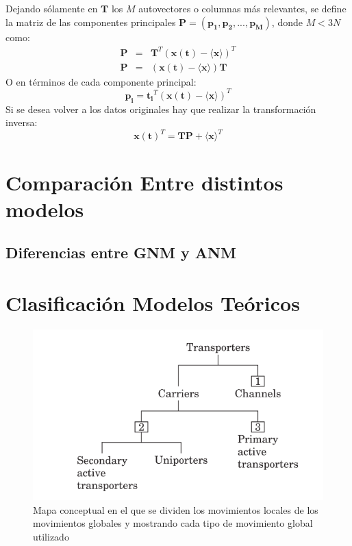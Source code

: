 Dejando s\'{o}lamente en $\mathbf{T}$ los $M$ autovectores o columnas m\'{a}s relevantes, se define la matriz de las componentes principales $\mathbf{P}=\left(\mathbf{p_1},\mathbf{p_2},...,\mathbf{p_{M}}\right)$, donde $M<3N$ como:
\begin{eqnarray}\label{eq:31}
\mathbf{P}&=&\mathbf{T}^T(\mathbf{x(t)}-\langle\mathbf{x}\rangle)^T \nonumber \\
\mathbf{P}&=&(\mathbf{x(t)}-\langle\mathbf{x}\rangle)\mathbf{T}
\end{eqnarray}
O en t\'{e}rminos de cada componente principal:
\begin{equation}\label{eq:32}
\mathbf{p_i}=\mathbf{t_i}^T(\mathbf{x(t)}-\langle\mathbf{x}\rangle)^T
\end{equation}
Si se desea volver a los datos originales hay que realizar la transformaci\'{o}n inversa:
\begin{equation}\label{eq:33}
\mathbf{x(t)}^T=\mathbf{T}\mathbf{P}+\langle\mathbf{x}\rangle^T
\end{equation}
\section{Comparaci\'{o}n Entre distintos modelos}
\subsection{Diferencias entre GNM y ANM}
\section{Clasificaci\'{o}n Modelos Te\'{o}ricos}
\begin{figure}
\centering%
\includegraphics[scale=0.3]{Kap2/clasif_din.png}%
\caption{Mapa conceptual en el que se dividen los movimientos locales de los movimientos globales y mostrando cada tipo de movimiento global utilizado} \label{fig:movs}
\end{figure}